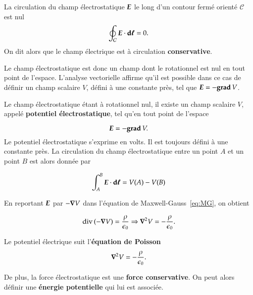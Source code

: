\begin{defn}
La circulation du champ électrostatique $\vece$ le long d'un contour fermé
orienté $\mathcal{C}$ est nul
\begin{equation}
	\oint_\mathcal{C} \vece \cdot \dl = 0.
\end{equation}
On dit alors que le champ électrique est à circulation \textbf{conservative}.
\end{defn}

Le champ électrostatique est donc un champ dont le rotationnel est nul en tout 
point de l'espace. L'analyse vectorielle affirme qu'il est possible dans ce cas 
de définir un champ scalaire $V$,
défini à une constante près, 
tel que $\vece = -\gradient V$.

\begin{defn}
	Le champ électrostatique étant à rotationnel nul, il existe un 
	champ scalaire $V$, appelé \textbf{potentiel électrostatique}, tel qu'en
	tout point de l'espace

	\begin{equation}
		\vece = -\gradient V.
		\label{eq:potentiel}
	\end{equation}
	Le potentiel électrostatique s'exprime en volts. Il est toujours défini
	à une constante près.
	La circulation du 
	champ électrostatique entre un point $A$ et un point $B$ est alors donnée
	par

	\begin{equation}
		\int_A^B \vece \cdot \dl = V(A) - V(B)
	\end{equation}
\end{defn}

En reportant $\vece$ par $-\grad V$ dans l'équation de 
Maxwell-Gauss~\ref{eq:MG}, on obtient

\begin{equation*}
	\div(-\grad V) = \dfrac{\rho}{\epsilon_0} \Rightarrow \laplacien V = 
	              -\dfrac{\rho}{\epsilon_0}.
\end{equation*}

\begin{defn}
	Le potentiel électrique suit l'\textbf{équation de Poisson}
	\begin{equation}
		\laplacien V = -\dfrac{\rho}{\epsilon_0}.
	\end{equation}
\end{defn}

De plus, la force électrostatique est une \textbf{force conservative}. On peut alors
définir une \textbf{énergie potentielle} qui lui est associée.

